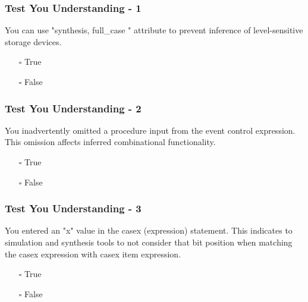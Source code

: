 \documentclass[t, notes, xcolor=table]{beamer}
\begin{document}
\begin{frame}
\frametitle{Test You Understanding - 1}
You can use "synthesis, full\_case " attribute to prevent inference of level-sensitive storage devices.
\begin{itemize}
\item[$\square$] True
\item[$\square$] False
\end{itemize}
\end{frame}

\begin{frame}
\frametitle{Test You Understanding - 2}
You inadvertently omitted a procedure input from the event control expression. This omission affects inferred combinational functionality.
\begin{itemize}
\item[$\square$] True
\item[$\square$] False
\end{itemize}
\end{frame}

\begin{frame}
\frametitle{Test You Understanding - 3}
You entered an "x" value in the casex (expression) statement. This indicates to simulation and synthesis tools to not consider that bit position when matching the casex expression with casex item expression.
\begin{itemize}
\item[$\square$] True
\item[$\square$] False
\end{itemize}
\end{frame}
\end{document}
